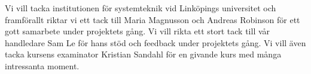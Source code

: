 Vi vill tacka institutionen för systemteknik vid Linköpings universitet och framförallt riktar vi ett tack till Maria Magnusson och Andreas Robinson för ett gott samarbete under projektets gång. Vi vill rikta ett stort tack till vår handledare Sam Le för hans stöd och feedback under projektets gång. Vi vill även tacka kursens examinator Kristian Sandahl för en givande kurs med många intressanta moment.

